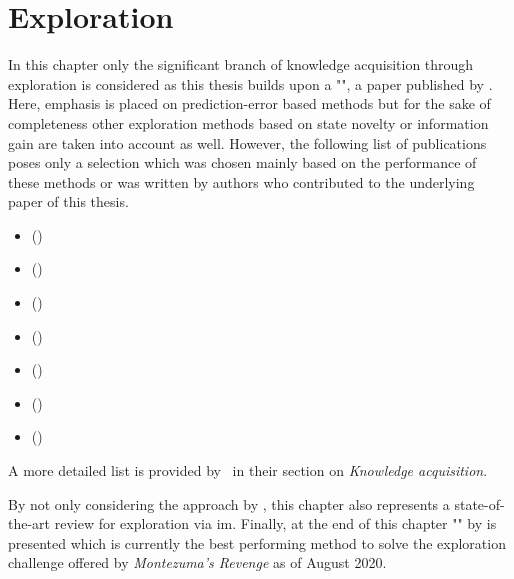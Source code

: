 \documentclass[draft,final]{vutinfth} %
\begin{document}
    \chapter{Exploration}\label{sec:state_of_the_art}
    In this chapter only the significant branch of knowledge acquisition through exploration is considered as this thesis builds upon a "", a paper published by \citet{burda_large-scale_2018-1}.
    Here, emphasis is placed on prediction-error based methods but for the sake of completeness other exploration methods based on state novelty or information gain are taken into account as well.
    However, the following list of publications poses only a selection which was chosen mainly based on the performance of these methods or was written by authors who contributed to the underlying paper of this thesis.

    \begin{itemize}
        \item {} (\citeauthor{stadie_incentivizing_2015})
        \item {} (\citeauthor{pathak_curiosity-driven_2017-1})
        \item {} (\citeauthor{kim_emi_2019})
        \item {} (\citeauthor{bellemare_unifying_2016})
        \item {} (\citeauthor{burda_exploration_2018})
        \item {} (\citeauthor{kim_emi_2019})
        \item {} (\citeauthor{pathak_self-supervised_2019})
    \end{itemize}

    A more detailed list is provided by~\citet[see Table 3]{aubret_survey_2019} in their section on \textit{Knowledge acquisition}.

    By not only considering the approach by \citet{burda_large-scale_2018-1}, this chapter also represents a state-of-the-art review for exploration via \gls{im}.
    Finally, at the end of this chapter "" by \citet{ecoffet_go-explore_2019} is presented which is currently the best performing method to solve the exploration challenge offered by \textit{Montezuma's Revenge} as of August 2020.
\end{document}
